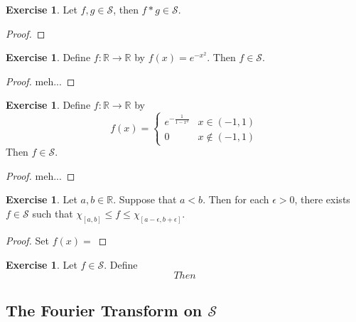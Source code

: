 \documentclass[12pt]{amsart}
\theoremstyle{definition}
\newtheorem{ex}[definition]{Exercise}
\newcommand{\ep}{\epsilon}
\newcommand{\R}{\mathbb{R}}
\newcommand{\MS}{\mathcal{S}}
\begin{document}
	\begin{ex}
		Let $f, g \in \MS$, then $f *g \in \MS$. 
	\end{ex}

	\begin{proof}
		
	\end{proof}

	\begin{ex}
		Define $f:\R \rightarrow \R$ by $f(x) = e^{-x^2}$. Then $f \in \MS$.
	\end{ex}
	
	\begin{proof}
		meh...
	\end{proof}
	

	\begin{ex}
		Define $f:\R \rightarrow \R$ by 
		\[
		f(x) = 
		\begin{cases}
			e^{- \frac{1}{1-x^2}} & x \in (-1, 1) \\
			0 & x \not \in (-1, 1)
		\end{cases}
		\]
		Then $f \in \MS$.
	\end{ex}
	
	\begin{proof}
		meh...
	\end{proof}

	\begin{ex}
		Let $a,b \in \R$. Suppose that $a < b$. Then for each $\ep >0$, there exists $f \in \MS$ such that $\chi_{[a,b]} \leq f \leq \chi_{[a-\ep , b + \ep]}$.
	\end{ex}

	\begin{proof}
		Set $f(x) = $
	\end{proof}

	\begin{ex}
		Let $f \in \MS$. Define $$Then $$
	\end{ex}
	
	
	
	
	
	
	
	
	
	
	
	
	
	
	
	
	
	
	\newpage
	\subsection{The Fourier Transform on $\MS$}
	
\end{document}
